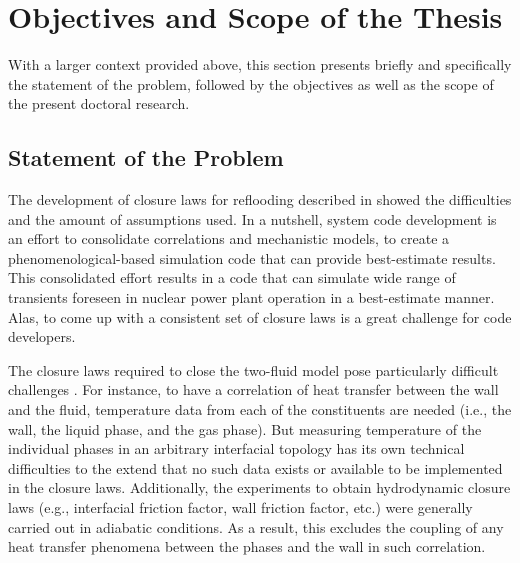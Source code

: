 \newpage
\section{Objectives and Scope of the Thesis}\label{sec:intro_objectives_and_scope}

With a larger context provided above,
this section presents briefly and specifically the statement of the problem,
followed by the objectives as well as the scope of the present doctoral research.

\subsection{Statement of the Problem}\label{sub:intro_statement_of_problem}

The development of closure laws for reflooding described in \cite{Nelson1992,USNRC2012} showed the difficulties and the amount of assumptions used.
In a nutshell, system code development is an effort to consolidate correlations and mechanistic models, to create a phenomenological-based simulation code that can provide best-estimate results.
This consolidated effort results in a code that can simulate wide range of transients foreseen in nuclear power plant operation in a best-estimate manner.
Alas, to come up with a consistent set of closure laws is a great challenge for code developers.

The closure laws required to close the two-fluid model pose particularly difficult challenges \cite{Wulff2007}.
For instance, to have a correlation of heat transfer between the wall and the fluid, temperature data from each of the constituents are needed (i.e., the wall, the liquid phase, and the gas phase).
But measuring temperature of the individual phases in an arbitrary interfacial topology has its own technical difficulties to the extend that no such data exists or available to be implemented in the closure laws.
Additionally, the experiments to obtain hydrodynamic closure laws (e.g., interfacial friction factor, wall friction factor, etc.) were generally carried out in adiabatic conditions.
As a result, this excludes the coupling of any heat transfer phenomena between the phases and the wall in such correlation.

